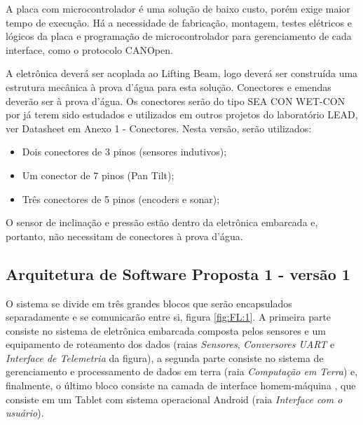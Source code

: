 A placa com microcontrolador é uma solução de baixo custo, porém exige maior
tempo de execução. Há a necessidade de fabricação, montagem, testes elétricos e
lógicos da placa e programação de microcontrolador para gerenciamento de cada
interface, como o protocolo CANOpen.

A eletrônica deverá ser acoplada ao Lifting Beam, logo deverá ser construída uma
estrutura mecânica à prova d’água para esta solução. Conectores e emendas
deverão ser à prova d'água. Os conectores serão do tipo SEA CON WET-CON por já
terem sido estudados e utilizados em outros projetos do laboratório LEAD,
ver Datasheet em Anexo 1 - Conectores. Nesta versão, serão utilizados:
\begin{itemize}
  \item Dois conectores de 3 pinos (sensores indutivos);
  \item Um conector de 7 pinos (Pan Tilt);
  \item Três conectores de 5 pinos (encoders e sonar);
\end{itemize}
O sensor de inclinação e pressão estão dentro da eletrônica embarcada e,
portanto, não necessitam de conectores à prova d'água.

\subsection{Arquitetura de Software Proposta 1 - versão 1}
O sistema se divide em três grandes blocos que serão encapsulados separadamente
e se comunicarão entre si, figura \ref{fig:FL:1}. A primeira parte consiste no
sistema de eletrônica embarcada composta pelos sensores e um equipamento de
roteamento dos dados (raias \emph{Sensores}, \emph{Conversores UART} e
\emph{Interface de Telemetria} da figura), a segunda parte consiste no sistema
de gerenciamento e processamento de dados em terra (raia \emph{Computação em
Terra}) e, finalmente, o último bloco consiste na camada de interface
homem-máquina , que consiste em um Tablet com sistema operacional Android (raia
\emph{Interface com o usuário}).

